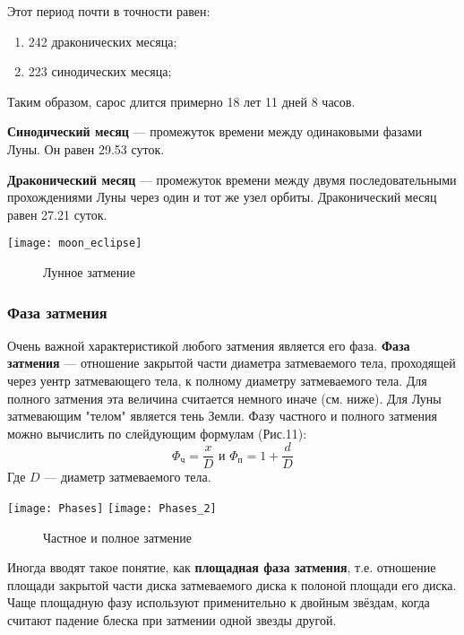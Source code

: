 Этот период почти в точности равен:
\begin{enumerate}
\item 242 драконических месяца;
\item 223 синодических месяца;
\end{enumerate}

Таким образом, сарос длится примерно 18 лет 11 дней 8 часов.

\textbf{Синодический месяц} --- промежуток времени между одинаковыми фазами Луны. Он равен 29.53 суток.

\textbf{Драконический месяц} --- промежуток времени между двумя последовательными прохождениями Луны через один и тот же узел орбиты. Драконический месяц равен 27.21 суток.
\begin{center}
\texttt{[image: moon\_eclipse]}
\begin{figure}[h!]
\caption{Лунное затмение}
\end{figure}
\end{center}
\subsubsection{Фаза затмения}
Очень важной характеристикой любого затмения является его фаза. \textbf{Фаза затмения} --- отношение закрытой части диаметра затмеваемого тела, проходящей через уентр затмевающего тела, к полному диаметру затмеваемого тела. Для полного затмения эта величина считается немного иначе (см. ниже). Для Луны затмевающим "телом" является тень Земли. Фазу частного и полного затмения можно вычислить по слейдующим формулам (Рис.11):
$$\Phi_{\text{ч}}=\frac{x}{D} \text{ и } \Phi_{\text{п}}=1+\frac{d}{D}$$
Где $D$ --- диаметр затмеваемого тела.
\begin{center}
\texttt{[image: Phases]}
\texttt{[image: Phases\_2]}
\begin{figure}[h!]
\caption{Частное и полное затмение}
\end{figure}
\end{center}

Иногда вводят такое понятие, как \textbf{площадная фаза затмения}, т.е. отношение площади закрытой части диска затмеваемого диска к полоной площади его диска. Чаще площадную фазу используют применительно к двойным звёздам, когда считают падение блеска при затмении одной звезды другой.